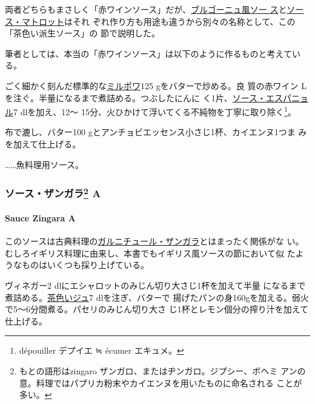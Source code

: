 \begin{recette}
両者どちらもまさしく「赤ワインソース」だが、\protect\hyperlink{sauce-bourguignonne}{ブルゴーニュ風ソー
ス}と\protect\hyperlink{sauce-matelote}{ソース・マトロット}はそれ
ぞれ作り方も用途も違うから別々の名称として、この「茶色い派生ソース」の
節で説明した。

筆者としては、本当の「赤ワインソース」は以下のように作るものと考えてい
る。

ごく細かく刻んだ標準的な\protect\hyperlink{mirepoix}{ミルポワ}125
gをバターで炒める。良 質の赤ワイン\undemi{}
Lを注ぐ。半量になるまで煮詰める。つぶしたにんに
く1片、\protect\hyperlink{sauce-espagnole}{ソース・エスパニョル}7\undemi{}
dlを加え、12〜
15分、火ひかけて浮いてくる不純物を丁寧に取り除く\footnote{dépouiller
  デプイエ ≒ écumer エキュメ。}。

布で漉し、バター100 gとアンチョビエッセンス小さじ1杯、カイエンヌ1つま
みを加えて仕上げる。

\ldots{}\ldots{}魚料理用ソース。

\maeaki

\hypertarget{ux30bdux30fcux30b9ux30b6ux30f3ux30acux30e997-a}{%
\subsubsection[ソース・ザンガラ
A]{\texorpdfstring{ソース・ザンガラ\footnote{もとの語形はzingaro
  ザンガロ、またはヂンガロ。ジプシー、ボヘミ
  アンの意。料理ではパプリカ粉末やカイエンヌを用いたものに命名される
  ことが多い。}
A}{ソース・ザンガラ A}}\label{ux30bdux30fcux30b9ux30b6ux30f3ux30acux30e997-a}}

\hypertarget{sauce-zingara-a}{%
\paragraph{Sauce Zingara A}\label{sauce-zingara-a}}

   

このソースは古典料理の\href{}{ガルニチュール・ザンガラ}とはまったく関係がな
い。むしろイギリス料理に由来し、本書でもイギリス風ソースの節において似
たようなものはいくつも採り上げている。

ヴィネガー2\undemi{} dlにエシャロットのみじん切り大さじ1杯を加えて半量
になるまで煮詰める。\protect\hyperlink{jus-de-veau-lie}{茶色いジュ}7
dlを注ぎ、バターで
揚げたパンの身160gを加える。弱火で5〜6分間煮る。パセリのみじん切り大さ
じ1杯とレモン\undemi{}個分の搾り汁を加えて仕上げる。


\end{recette}
